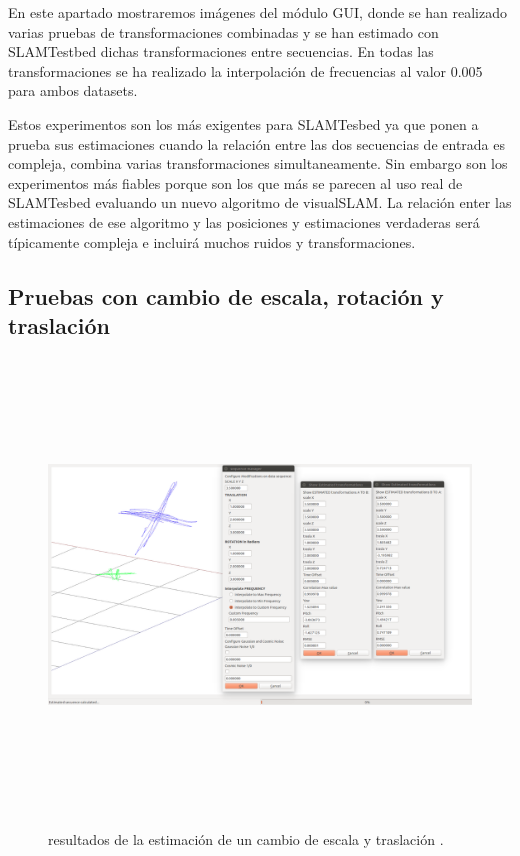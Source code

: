 En este apartado mostraremos imágenes del módulo GUI, donde se han realizado varias pruebas de transformaciones combinadas y se han estimado con SLAMTestbed dichas transformaciones entre secuencias.
En todas las transformaciones se ha realizado la interpolación de frecuencias al valor 0.005 para ambos datasets.

Estos experimentos son los más exigentes para SLAMTesbed ya que ponen a prueba sus estimaciones cuando la relación entre las dos secuencias de entrada es compleja, combina varias transformaciones simultaneamente. Sin embargo son los experimentos más fiables porque son los que más se parecen al uso real de SLAMTesbed evaluando un nuevo algoritmo de visualSLAM. La relación enter las estimaciones de ese algoritmo y las posiciones y estimaciones verdaderas será típicamente compleja e incluirá muchos ruidos y transformaciones.

\subsection{Pruebas con cambio de escala, rotación y traslación}
\begin{figure}[h]
\begin{center}
\label{fig:opciones de View}\includegraphics[height=12.0cm,width=18.0cm]{img/cap6/Escala_Trasla_Rota_abba.png}
\hspace{0.5cm}

\end{center}

\caption{ resultados de la estimación de un cambio de escala y traslación .}
\end{figure}

